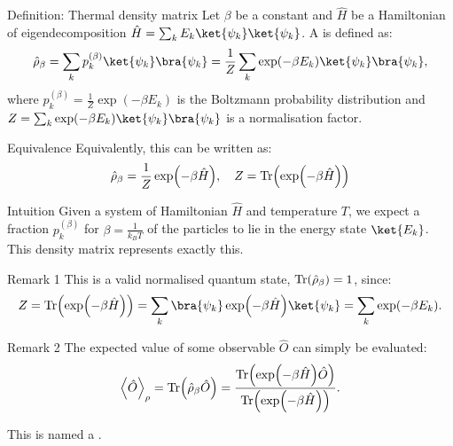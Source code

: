 \documentclass[a4paper]{article}
\begin{document}
\begin{parag}{Definition: Thermal density matrix}
    Let $\beta$ be a constant and $\hat{H}$ be a Hamiltonian of eigendecomposition $\hat{H} = \sum_{k} E_k\ket{\psi_k}\ket{\psi_k}$. A  is defined as: 
    \[\hat{\rho}_{\beta} = \sum_{k} p_k^{\left(\beta\right)} \ket{\psi_k} \bra{\psi_k} = \frac{1}{Z} \sum_{k} \exp\left(-\beta E_k\right) \ket{\psi_k}\bra{\psi_k},\]
    where $p_k^{\left(\beta\right)} = \frac{1}{Z} \exp\left(-\beta E_k\right)$ is the Boltzmann probability distribution and $Z = \sum_{k} \exp\left(- \beta E_k\right) \ket{\psi_k} \bra{\psi_k}$ is a normalisation factor.

    \begin{subparag}{Equivalence}
        Equivalently, this can be written as: 
        \[\hat{\rho}_{\beta} = \frac{1}{Z} \exp\left(-\beta \hat{H}\right), \mathspace Z = \Tr\left(\exp\left(-\beta \hat{H}\right)\right)\]
    \end{subparag}

    \begin{subparag}{Intuition}
        Given a system of Hamiltonian $\hat{H}$ and temperature $T$, we expect a fraction $p_k^{\left(\beta\right)}$ for $\beta = \frac{1}{k_B T}$ of the particles to lie in the energy state $\ket{E_k}$. This density matrix represents exactly this.
    \end{subparag}
    
    \begin{subparag}{Remark 1}
        This is a valid normalised quantum state, $\Tr\left(\hat{\rho}_{\beta}\right) = 1$, since:
        \[Z = \Tr \left(\exp\left(- \beta \hat{H}\right)\right) = \sum_{k} \bra{\psi_k} \exp\left(-\beta \hat{H}\right) \ket{\psi_k} = \sum_{k} \exp\left(-\beta E_k\right).\]
    \end{subparag}

    \begin{subparag}{Remark 2}
        The expected value of some observable $\hat{O}$ can simply be evaluated: 
        \[\left\langle \hat{O} \right\rangle_{\rho} = \Tr \left(\hat{\rho}_{\beta} \hat{O}\right) = \frac{\Tr \left(\exp\left(-\beta \hat{H}\right) \hat{O}\right)}{\Tr \left(\exp\left(-\beta \hat{H}\right)\right)}.\]

        This is named a .
    \end{subparag}
\end{parag}
\end{document}
